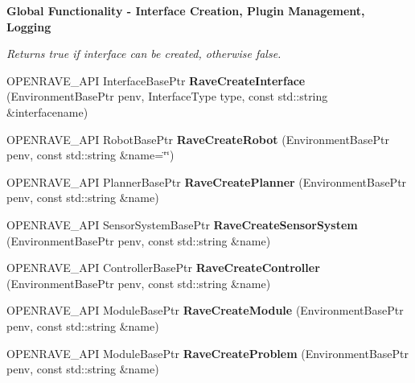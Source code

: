 \begin{Indent}{\bf Global Functionality -\/ Interface Creation, Plugin Management, Logging}
\begin{DoxyCompactItemize}
\begin{DoxyCompactList}\small\item\em Returns true if interface can be created, otherwise false. \item\end{DoxyCompactList}\item 
\hypertarget{namespaceOpenRAVE_aeb861c4ac6a6d508203eb5204f6f5356}{
OPENRAVE\_\-API InterfaceBasePtr {\bfseries RaveCreateInterface} (EnvironmentBasePtr penv, InterfaceType type, const std::string \&interfacename)}
\label{namespaceOpenRAVE_aeb861c4ac6a6d508203eb5204f6f5356}

\item 
\hypertarget{namespaceOpenRAVE_a0cd0346e27cf262253e8663ebf6570c5}{
OPENRAVE\_\-API RobotBasePtr {\bfseries RaveCreateRobot} (EnvironmentBasePtr penv, const std::string \&name=\char`\"{}\char`\"{})}
\label{namespaceOpenRAVE_a0cd0346e27cf262253e8663ebf6570c5}

\item 
\hypertarget{namespaceOpenRAVE_ad7a69c02ba562b1592849b98bc71980b}{
OPENRAVE\_\-API PlannerBasePtr {\bfseries RaveCreatePlanner} (EnvironmentBasePtr penv, const std::string \&name)}
\label{namespaceOpenRAVE_ad7a69c02ba562b1592849b98bc71980b}

\item 
\hypertarget{namespaceOpenRAVE_a8b9457824b88c287764fd4beee80e416}{
OPENRAVE\_\-API SensorSystemBasePtr {\bfseries RaveCreateSensorSystem} (EnvironmentBasePtr penv, const std::string \&name)}
\label{namespaceOpenRAVE_a8b9457824b88c287764fd4beee80e416}

\item 
\hypertarget{namespaceOpenRAVE_a04c8ec1b6bd90d09a2cf077e207fee39}{
OPENRAVE\_\-API ControllerBasePtr {\bfseries RaveCreateController} (EnvironmentBasePtr penv, const std::string \&name)}
\label{namespaceOpenRAVE_a04c8ec1b6bd90d09a2cf077e207fee39}

\item 
\hypertarget{namespaceOpenRAVE_ac418b89191466b59a4ffbb5a759c5a95}{
OPENRAVE\_\-API ModuleBasePtr {\bfseries RaveCreateModule} (EnvironmentBasePtr penv, const std::string \&name)}
\label{namespaceOpenRAVE_ac418b89191466b59a4ffbb5a759c5a95}

\item 
\hypertarget{namespaceOpenRAVE_a20a65c6196fe9f4d94aade47b9c7cfd0}{
OPENRAVE\_\-API ModuleBasePtr {\bfseries RaveCreateProblem} (EnvironmentBasePtr penv, const std::string \&name)}
\label{namespaceOpenRAVE_a20a65c6196fe9f4d94aade47b9c7cfd0}


\end{DoxyCompactItemize}
\end{Indent}
